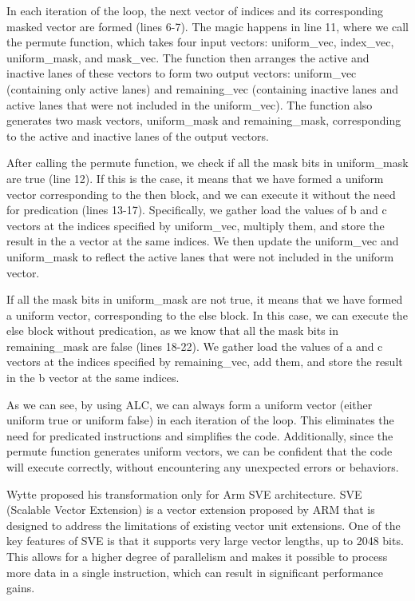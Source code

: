 \documentclass[\main/thesis.tex]{subfiles}
\begin{document}
In each iteration of the loop, the next vector of indices and its corresponding masked vector are formed (lines 6-7). The magic happens in line 11, where we call the permute function, which takes four input vectors: uniform\_vec, index\_vec, uniform\_mask, and mask\_vec. The function then arranges the active and inactive lanes of these vectors to form two output vectors: uniform\_vec (containing only active lanes) and remaining\_vec (containing inactive lanes and active lanes that were not included in the uniform\_vec). The function also generates two mask vectors, uniform\_mask and remaining\_mask, corresponding to the active and inactive lanes of the output vectors.

After calling the permute function, we check if all the mask bits in uniform\_mask are true (line 12). If this is the case, it means that we have formed a uniform vector corresponding to the then block, and we can execute it without the need for predication (lines 13-17). Specifically, we gather load the values of b and c vectors at the indices specified by uniform\_vec, multiply them, and store the result in the a vector at the same indices. We then update the uniform\_vec and uniform\_mask to reflect the active lanes that were not included in the uniform vector.

If all the mask bits in uniform\_mask are not true, it means that we have formed a uniform vector, corresponding to the else block. In this case, we can execute the else block without predication, as we know that all the mask bits in remaining\_mask are false (lines 18-22). We gather load the values of a and c vectors at the indices specified by remaining\_vec, add them, and store the result in the b vector at the same indices.

As we can see, by using ALC, we can always form a uniform vector (either uniform true or uniform false) in each iteration of the loop. This eliminates the need for predicated instructions and simplifies the code. Additionally, since the permute function generates uniform vectors, we can be confident that the code will execute correctly, without encountering any unexpected errors or behaviors.


Wytte proposed his transformation only for Arm SVE architecture. SVE (Scalable Vector Extension) is a vector extension proposed by ARM that is designed to address the limitations of existing vector unit extensions. One of the key features of SVE is that it supports very large vector lengths, up to 2048 bits. This allows for a higher degree of parallelism and makes it possible to process more data in a single instruction, which can result in significant performance gains.
\end{document}
